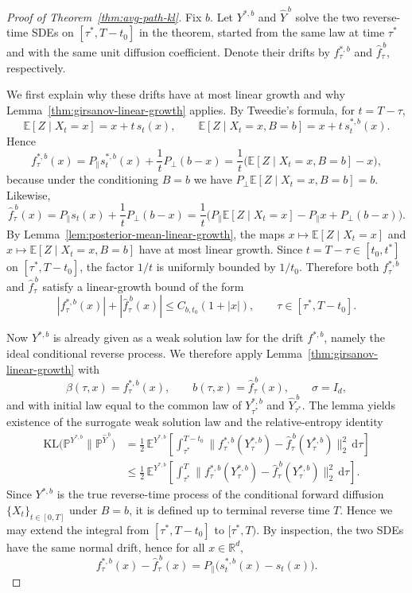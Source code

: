 \documentclass[twoside,11pt]{article}
\newcommand{\R}{\mathbb{R}}
\newcommand{\E}{\mathbb{E}}
\newcommand{\PP}{\mathbb{P}}
\newcommand{\dd}{\mathrm{d}}
\newcommand{\KL}{\mathrm{KL}}
\numberwithin{equation}{section}
\begin{document}
\begin{proof}[Proof of Theorem~\ref{thm:avg-path-kl}]
Fix \(b\). Let \(Y^{*,b}\) and \(\hat Y^{\,b}\) solve the two reverse-time SDEs on
\([\tau^*,T-t_0]\) in the theorem, started from the same law at time \(\tau^*\) and with the
same unit diffusion coefficient. Denote their drifts by \(f_\tau^{*,b}\) and
\(\hat f_\tau^{\,b}\), respectively.

We first explain why these drifts have at most linear growth and why
Lemma~\ref{thm:girsanov-linear-growth} applies. By Tweedie’s formula, for \(t=T-\tau\),
\[
\E[Z\mid X_t=x]=x+t\,s_t(x),
\qquad
\E[Z\mid X_t=x,B=b]=x+t\,s_t^{*,b}(x).
\]
Hence
\[
f_\tau^{*,b}(x)
=
P_\parallel s_t^{*,b}(x)+\frac{1}{t}P_\perp(b-x)
=
\frac{1}{t}\bigl(\E[Z\mid X_t=x,B=b]-x\bigr),
\]
because under the conditioning \(B=b\) we have
\(P_\perp \E[Z\mid X_t=x,B=b]=b\). Likewise,
\[
\hat f_\tau^{\,b}(x)
=
P_\parallel s_t(x)+\frac{1}{t}P_\perp(b-x)
=
\frac{1}{t}\bigl(P_\parallel \E[Z\mid X_t=x]-P_\parallel x + P_\perp(b-x)\bigr).
\]
By Lemma~\ref{lem:posterior-mean-linear-growth}, the maps
\(x\mapsto \E[Z\mid X_t=x]\) and \(x\mapsto \E[Z\mid X_t=x,B=b]\) have at most linear growth.
Since \(t=T-\tau\in[t_0,t^*]\) on \([\tau^*,T-t_0]\), the factor \(1/t\) is uniformly bounded by
\(1/t_0\). Therefore both \(f_\tau^{*,b}\) and \(\hat f_\tau^{\,b}\) satisfy a linear-growth bound
of the form
\[
|f_\tau^{*,b}(x)|+|\hat f_\tau^{\,b}(x)|
\le C_{b,t_0}(1+|x|),
\qquad \tau\in[\tau^*,T-t_0].
\]

Now \(Y^{*,b}\) is already given as a weak solution law for the drift \(f^{*,b}\), namely the
ideal conditional reverse process. We therefore apply
Lemma~\ref{thm:girsanov-linear-growth} with
\[
\beta(\tau,x)=f_\tau^{*,b}(x),
\qquad
b(\tau,x)=\hat f_\tau^{\,b}(x),
\qquad
\sigma=I_d,
\]
and with initial law equal to the common law of \(Y^{*,b}_{\tau^*}\) and \(\hat Y^{\,b}_{\tau^*}\).
The lemma yields existence of the surrogate weak solution law and the relative-entropy identity
\begin{align}
\label{eq:pathKL_girsanov_clean}
\KL\!\big(\PP^{Y^{*,b}}\big\|\PP^{\hat Y^{\,b}}\big)
&=
\frac12\,\E^{Y^{*,b}}\!\left[\int_{\tau^*}^{T-t_0}
\big\|f_\tau^{*,b}(Y_\tau^{*,b})-\hat f_\tau^{\,b}(Y_\tau^{*,b})\big\|_2^2\,\dd \tau\right] \nonumber\\
&\le
\frac12\,\E^{Y^{*,b}}\!\left[\int_{\tau^*}^{T}
\big\|f_\tau^{*,b}(Y_\tau^{*,b})-\hat f_\tau^{\,b}(Y_\tau^{*,b})\big\|_2^2\,\dd \tau\right].
\end{align}
Since \(Y^{*,b}\) is the true reverse-time process of the conditional forward diffusion
\(\{X_t\}_{t\in[0,T]}\) under \(B=b\), it is defined up to terminal reverse time \(T\).
Hence we may extend the integral from \([\tau^*,T-t_0]\) to \([\tau^*,T)\).
By inspection, the two SDEs have the same normal drift, hence for all \(x\in\R^d\),
\begin{equation}\label{eq:drift_gap_parallel}
f_\tau^{*,b}(x)-\hat f_\tau^{\,b}(x)
=
P_\parallel\Big(s_t^{*,b}(x)-s_t(x)\Big).
\end{equation}


\end{proof}
\end{document}
